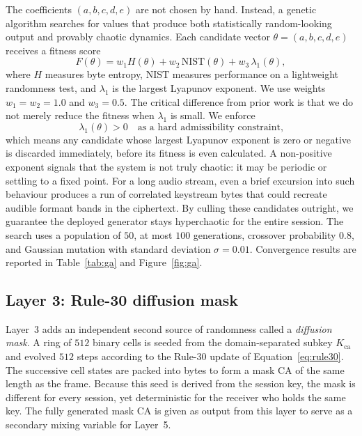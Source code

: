 \documentclass[pdflatex,sn-mathphys-num]{sn-jnl}%
\theoremstyle{thmstyleone}%
\theoremstyle{thmstyletwo}%
\theoremstyle{thmstylethree}%
\begin{document}
The coefficients $(a,b,c,d,e)$ are not chosen by hand. Instead, a genetic algorithm searches for values that produce both statistically random-looking output and provably chaotic dynamics. Each candidate vector $\theta=(a,b,c,d,e)$ receives a fitness score
\begin{equation}
F(\theta) = w_1 H(\theta) + w_2\, \mathrm{NIST}(\theta) + w_3\, \lambda_1(\theta),
\label{eq:fitness}
\end{equation}
where $H$ measures byte entropy, $\mathrm{NIST}$ measures performance on a lightweight randomness test, and $\lambda_1$ is the largest Lyapunov exponent. We use weights $w_1 = w_2 = 1.0$ and $w_3 = 0.5$. The critical difference from prior work is that we do not merely reduce the fitness when $\lambda_1$ is small. We enforce
\begin{equation}
\lambda_1(\theta) > 0 \quad \text{as a hard admissibility constraint,}
\label{eq:constraint}
\end{equation}
which means any candidate whose largest Lyapunov exponent is zero or negative is discarded immediately, before its fitness is even calculated. A non-positive exponent signals that the system is not truly chaotic: it may be periodic or settling to a fixed point. For a long audio stream, even a brief excursion into such behaviour produces a run of correlated keystream bytes that could recreate audible formant bands in the ciphertext. By culling these candidates outright, we guarantee the deployed generator stays hyperchaotic for the entire session. The search uses a population of $50$, at most $100$ generations, crossover probability $0.8$, and Gaussian mutation with standard deviation $\sigma=0.01$. Convergence results are reported in Table~\ref{tab:ga} and Figure~\ref{fig:ga}.

\subsection{Layer 3: Rule-30 diffusion mask}
\label{sec:layer3}

Layer~3 adds an independent second source of randomness called a \emph{diffusion mask}. A ring of $512$ binary cells is seeded from the domain-separated subkey $K_{\mathrm{ca}}$ and evolved $512$ steps according to the Rule-30 update of Equation~\eqref{eq:rule30}. The successive cell states are packed into bytes to form a mask $\mathrm{CA}$ of the same length as the frame. Because this seed is derived from the session key, the mask is different for every session, yet deterministic for the receiver who holds the same key. The fully generated mask $\mathrm{CA}$ is given as output from this layer to serve as a secondary mixing variable for Layer~5.
\end{document}
